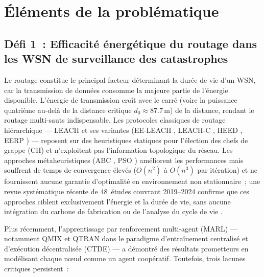 \section{Éléments de la problématique}\label{sec:Problematique}

\subsection{Défi 1~: Efficacité énergétique du routage dans les WSN de surveillance des catastrophes}

Le routage constitue le principal facteur déterminant la durée de vie d'un WSN, car la transmission de données consomme la majeure partie de l'énergie disponible. L'énergie de transmission croît avec le carré (voire la puissance quatrième au-delà de la distance critique $d_0 \approx 87.7$\,m) de la distance, rendant le routage multi-sauts indispensable. Les protocoles classiques de routage hiérarchique --- LEACH \cite{heinzelman2000leach} et ses variantes (EE-LEACH \cite{kumar2012eeleach}, LEACH-C \cite{heinzelman2002leach}, HEED \cite{younis2004heed}, EERP \cite{sha2013eerp}) --- reposent sur des heuristiques statiques pour l'élection des chefs de grappe (CH) et n'exploitent pas l'information topologique du réseau. Les approches métaheuristiques (ABC \cite{karaboga2005abc}, PSO \cite{kennedy1995pso}) améliorent les performances mais souffrent de temps de convergence élevés ($O(n^2)$ à $O(n^3)$ par itération) et ne fournissent aucune garantie d'optimalité en environnement non stationnaire~; une revue systématique récente de 48~études couvrant 2019--2024 confirme que ces approches ciblent exclusivement l'énergie et la durée de vie, sans aucune intégration du carbone de fabrication ou de l'analyse du cycle de vie \cite{metaheuristic_wsn_slr2026}.

Plus récemment, l'apprentissage par renforcement multi-agent (MARL) --- notamment QMIX \cite{rashid2018qmix} et QTRAN \cite{son2019qtran} dans le paradigme d'entraînement centralisé et d'exécution décentralisée (CTDE) --- a démontré des résultats prometteurs en modélisant chaque n\oe{}ud comme un agent coopératif. Toutefois, trois lacunes critiques persistent~:

